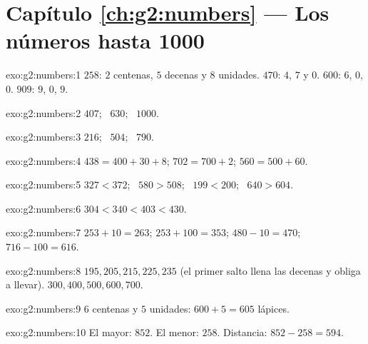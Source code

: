 \section*{Capítulo \ref{ch:g2:numbers} --- Los números hasta 1000}

\begin{solution}{exo:g2:numbers:1}
$258$: $2$ centenas, $5$ decenas y $8$ unidades. $470$: $4$, $7$ y $0$.
$600$: $6$, $0$, $0$. $909$: $9$, $0$, $9$.
\end{solution}

\begin{solution}{exo:g2:numbers:2}
$407$; \ $630$; \ $1000$.
\end{solution}

\begin{solution}{exo:g2:numbers:3}
$216$; \ $504$; \ $790$.
\end{solution}

\begin{solution}{exo:g2:numbers:4}
$438 = 400 + 30 + 8$; \quad $702 = 700 + 2$; \quad
$560 = 500 + 60$.
\end{solution}

\begin{solution}{exo:g2:numbers:5}
$327 < 372$; \ $580 > 508$; \ $199 < 200$; \ $640 > 604$.
\end{solution}

\begin{solution}{exo:g2:numbers:6}
$304 < 340 < 403 < 430$.
\end{solution}

\begin{solution}{exo:g2:numbers:7}
$253 + 10 = 263$; \quad $253 + 100 = 353$; \quad
$480 - 10 = 470$; \quad $716 - 100 = 616$.
\end{solution}

\begin{solution}{exo:g2:numbers:8}
$195, 205, 215, 225, 235$ (el primer salto llena las decenas y
obliga a llevar). $300, 400, 500, 600, 700$.
\end{solution}

\begin{solution}{exo:g2:numbers:9}
$6$ centenas y $5$ unidades: $600 + 5 = 605$ lápices.
\end{solution}

\begin{solution}{exo:g2:numbers:10}
El mayor: $852$. El menor: $258$. Distancia:
$852 - 258 = 594$.
\end{solution}
